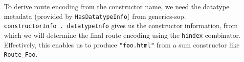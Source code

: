 \begin{Shaded}
\begin{Highlighting}[]
 \OtherTok{=\textgreater{}}\OtherTok{{-}\textgreater{}} 
\OtherTok{=} 
\end{Highlighting}
\end{Shaded}

To derive route encoding from the constructor name, we need the datatype
metadata (provided by \texttt{HasDatatypeInfo}) from generics-sop.
\texttt{constructorInfo\ .\ datatypeInfo} gives us the constructor
information, from which we will determine the final route encoding using
the \texttt{hindex} combinator. Effectively, this enables us to produce
\texttt{"foo.html"} from a sum constructor like \texttt{Route\_Foo}.

